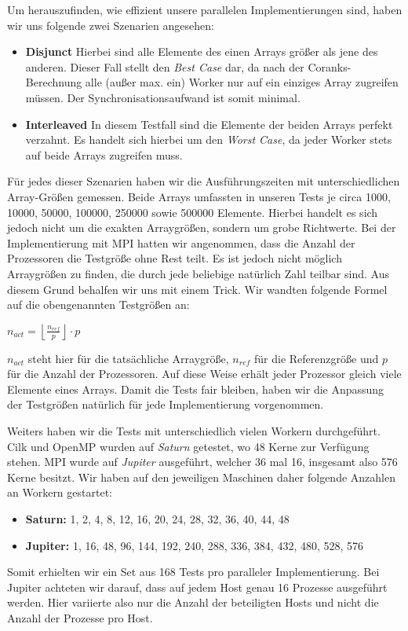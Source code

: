 Um herauszufinden, wie effizient unsere parallelen Implementierungen sind, haben wir uns folgende zwei Szenarien angesehen:
\begin{itemize}
	\item \textbf{Disjunct}\quad
		Hierbei sind alle Elemente des einen Arrays größer als jene des anderen.
		Dieser Fall stellt den \emph{Best Case} dar, da nach der Coranks-Berechnung alle (außer max. ein) Worker nur auf ein einziges Array zugreifen müssen.
		Der Synchronisationsaufwand ist somit minimal.
		
	\item \textbf{Interleaved}\quad
		In diesem Testfall sind die Elemente der beiden Arrays perfekt verzahnt.
		Es handelt sich hierbei um den \emph{Worst Case}, da jeder Worker stets auf beide Arrays zugreifen muss.
\end{itemize}

Für jedes dieser Szenarien haben wir die Ausführungszeiten mit unterschiedlichen Array-Größen gemessen.
Beide Arrays umfassten in unseren Tests je circa 1000, 10000, 50000, 100000, 250000 sowie 500000 Elemente.
Hierbei handelt es sich jedoch nicht um die exakten Arraygrößen, sondern um grobe Richtwerte.
Bei der Implementierung mit MPI hatten wir angenommen, dass die Anzahl der Prozessoren die Testgröße ohne Rest teilt.
Es ist jedoch nicht möglich Arraygrößen zu finden, die durch jede beliebige natürlich Zahl teilbar sind.
Aus diesem Grund behalfen wir uns mit einem Trick.
Wir wandten folgende Formel auf die obengenannten Testgrößen an:
\begin{center}
	$n_{act} = \left \lfloor{\frac{n_{ref}}{p}}\right \rfloor \cdot p$
\end{center}

$n_{act}$ steht hier für die tatsächliche Arraygröße, $n_{ref}$ für die Referenzgröße und $p$ für die Anzahl der Prozessoren.
Auf diese Weise erhält jeder Prozessor gleich viele Elemente eines Arrays.
Damit die Tests fair bleiben, haben wir die Anpassung der Testgrößen natürlich für jede Implementierung vorgenommen.
 
Weiters haben wir die Tests mit unterschiedlich vielen Workern durchgeführt.
Cilk und OpenMP wurden auf \emph{Saturn} getestet, wo 48 Kerne zur Verfügung stehen.
MPI wurde auf \emph{Jupiter} ausgeführt, welcher 36 mal 16, insgesamt also 576 Kerne besitzt.
Wir haben auf den jeweiligen Maschinen daher folgende Anzahlen an Workern gestartet:
\begin{itemize}
	\item \textbf{Saturn:} 1, 2, 4, 8, 12, 16, 20, 24, 28, 32, 36, 40, 44, 48
	\item \textbf{Jupiter:} 1, 16, 48, 96, 144, 192, 240, 288, 336, 384, 432, 480, 528, 576
\end{itemize}
 
Somit erhielten wir ein Set aus 168 Tests pro paralleler Implementierung.
Bei Jupiter achteten wir darauf, dass auf jedem Host genau 16 Prozesse ausgeführt werden.
Hier variierte also nur die Anzahl der beteiligten Hosts und nicht die Anzahl der Prozesse pro Host. 